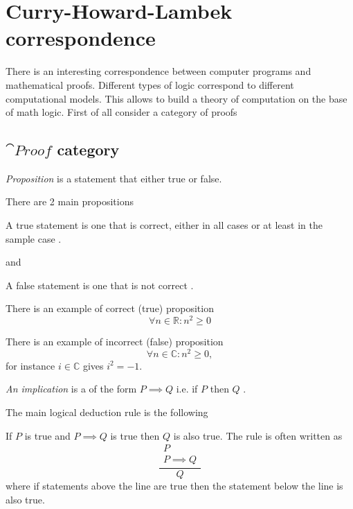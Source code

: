 \chapter{Curry-Howard-Lambek correspondence}
\label{sec:curry_howard_lambek}
There is an interesting correspondence between computer programs and
mathematical proofs. Different types of logic correspond to different
computational models. This allows to build a theory of computation on
the base of math logic. First of all consider a category of proofs
\section{$\cat{Proof}$ category}
\begin{definition}[Proposition]
\label{def:proposition}
\textit{Proposition} is a statement that either true or false.
\end{definition}

There are 2 main propositions
\begin{definition}[True]
\label{def:true}
A true statement is one that is correct, either in all cases or at
least in the sample case \cite{bib:studycom:truefalse}. 
\end{definition}
and
\begin{definition}[False]
\label{def:false}
A false statement is one that is not correct \cite{bib:studycom:truefalse}. 
\end{definition}


\begin{example}[Proposition]
\label{ex:proposition}
There is an example of correct (true) proposition
\[
\forall n \in \mathbb{R}: n^2 \ge 0
\]

There is an example of incorrect (false) proposition
\[
\forall n \in \mathbb{C}: n^2 \ge 0,
\]
for instance $i \in \mathbb{C}$ gives $i^2 = -1$.

\end{example}

\begin{definition}[Implication]
\label{def:implication} \textit{An implication} is a
 of the form $P \implies Q$ i.e. if $P$
then $Q$ \cite{bib:whatisaproof}.
\end{definition}

The main logical deduction rule is the following
\begin{definition}
\label{def:modusponens}
If $P$ is true and $P \implies Q$ is true then $Q$ is also true. The
rule is often written as \cite{bib:whatisaproof}
\[
\frac{
\begin{array}{c}
P \\
P \implies Q
\end{array}
}{Q}
\]
where if statements above the line are true then the statement below
the line is also true.
\end{definition}

